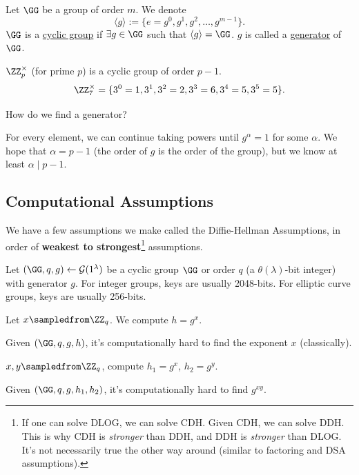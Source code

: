 \begin{definition}
    Let $\GG$ be a group of order $m$. We denote
    \[\langle g\rangle := \{e=g^0, g^1, g^2, \dots, g^{m-1}\}.\]
    $\GG$ is a \ul{cyclic group} if $\exists g\in \GG$ such that $\langle g\rangle = \GG$. $g$ is called a \ul{generator} of $\GG$.
\end{definition}

\begin{example*}
    $\ZZ_p^\times$ (for prime $p$) is a cyclic group of order $p-1$.
    \[\ZZ_7^\times = \{3^0 = 1, 3^1, 3^2=2, 3^3 = 6, 3^4 = 5, 3^5 = 5\}.\]
\end{example*}
\begin{ques*}
    How do we find a generator?
\end{ques*}
For every element, we can continue taking powers until $g^\alpha = 1$ for some $\alpha$. We hope that $\alpha = p-1$ (the order of $g$ is the order of the group), but we know at least $\alpha \mid p-1$.

\subsection{Computational Assumptions}

We have a few assumptions we make called the Diffie-Hellman Assumptions, in order of \textbf{weakest to strongest}\footnote{If one can solve DLOG, we can solve CDH. Given CDH, we can solve DDH. This is why CDH is \emph{stronger} than DDH, and DDH is \emph{stronger} than DLOG. It's not necessarily true the other way around (similar to factoring and DSA assumptions). } assumptions.

Let $(\GG, q, g)\leftarrow \mathcal{G}(1^\lambda)$ be a cyclic group $\GG$ or order $q$ (a $\theta(\lambda)$-bit integer) with generator $g$. For integer groups, keys are usually 2048-bits. For elliptic curve groups, keys are usually 256-bits.

\begin{definition}
    Let $x\sampledfrom \ZZ_q$. We compute $h = g^x$.

    Given $(\GG, q, g, h)$, it's computationally hard to find the exponent $x$ (classically).
\end{definition}

\begin{definition}
    $x, y\sampledfrom \ZZ_q$, compute $h_1 = g^x$, $h_2 = g^y$.

    Given $(\GG, q, g, h_1, h_2)$, it's computationally hard to find $g^{xy}$.
\end{definition}


